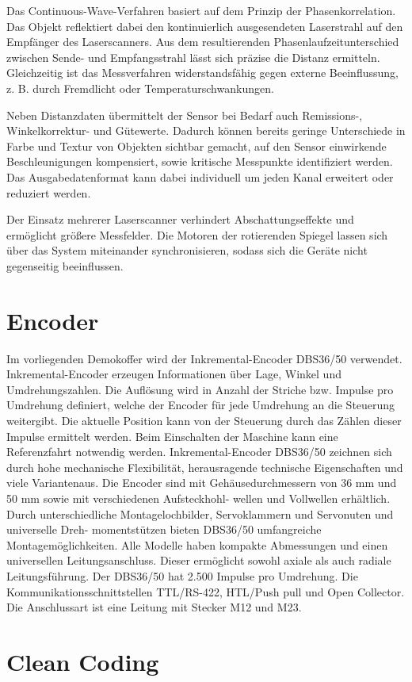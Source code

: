 Das Continuous-Wave-Verfahren basiert auf dem Prinzip der Phasenkorrelation. Das Objekt reflektiert dabei den kontinuierlich ausgesendeten Laserstrahl auf den Empfänger des Laserscanners. Aus dem resultierenden Phasenlaufzeitunterschied zwischen Sende- und Empfangsstrahl lässt sich präzise die Distanz ermitteln. Gleichzeitig ist das Messverfahren widerstandsfähig gegen externe Beeinflussung, z. B. durch Fremdlicht oder Temperaturschwankungen.

Neben Distanzdaten übermittelt der Sensor bei Bedarf auch Remissions-, Winkelkorrektur- und Gütewerte. Dadurch können bereits geringe Unterschiede in Farbe und Textur von Objekten sichtbar gemacht, auf den Sensor einwirkende Beschleunigungen kompensiert, sowie kritische Messpunkte identifiziert werden. Das Ausgabedatenformat kann dabei individuell um jeden Kanal erweitert oder reduziert werden.

Der Einsatz mehrerer Laserscanner verhindert Abschattungseffekte und ermöglicht größere Messfelder. Die Motoren der rotierenden Spiegel lassen sich über das System miteinander synchronisieren, sodass sich die Geräte nicht gegenseitig beeinflussen.\cite{.31.08.2022}

\section{Encoder}
Im vorliegenden Demokoffer wird der Inkremental-Encoder DBS36/50 verwendet. Inkremental-Encoder erzeugen Informationen über Lage, Winkel und Umdrehungszahlen. Die Auflösung wird in Anzahl der Striche bzw. Impulse pro Umdrehung definiert, welche der Encoder für jede Umdrehung an die Steuerung weitergibt. Die aktuelle Position kann von der Steuerung durch das Zählen dieser Impulse ermittelt werden. Beim Einschalten der Maschine kann eine Referenzfahrt notwendig werden.\cite{.31.08.2022b}
Inkremental-Encoder DBS36/50 zeichnen sich durch hohe mechanische Flexibilität, herausragende technische Eigenschaften und
viele Variantenaus. Die Encoder sind mit Gehäusedurchmessern von 36 mm und 50 mm sowie mit verschiedenen Aufsteckhohl-
wellen und Vollwellen erhältlich. Durch unterschiedliche Montagelochbilder, Servoklammern und Servonuten und universelle Dreh-
momentstützen bieten DBS36/50 umfangreiche Montagemöglichkeiten. Alle Modelle haben kompakte Abmessungen und einen
universellen Leitungsanschluss. Dieser ermöglicht sowohl axiale als auch radiale Leitungsführung. Der DBS36/50 hat 2.500 Impulse pro Umdrehung. Die Kommunikationsschnittstellen TTL/RS-422, HTL/Push pull und Open Collector. Die Anschlussart ist eine Leitung mit Stecker M12 und M23.



\section{Clean Coding}


